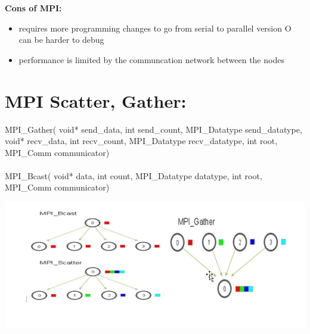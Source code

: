 \documentclass[10pt,a4paper]{article}
\begin{document}
\textbf{Cons of MPI:}  
\begin{itemize}
	\item requires more programming changes to go from serial to parallel version O can be harder to debug 
	\item  performance is limited by the communcation network between the nodes 
	
\end{itemize}

\newpage

\section{MPI Scatter, Gather:} 

MPI\_Gather( void* send\_data, int send\_count,  MPI\_Datatype send\_datatype, void* recv\_data, int recv\_count, MPI\_Datatype recv\_datatype,  	int root, MPI\_Comm communicator) \\ \\
MPI\_Bcast( void* data,  int count,  MPI\_Datatype datatype,  int root, MPI\_Comm communicator)

\includegraphics[scale=0.75]{MPI_06}
\end{document}
